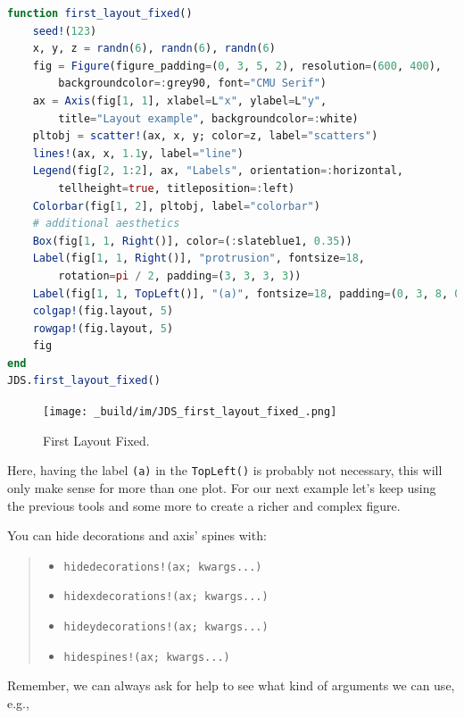 \documentclass[
  notoc %
]{tufte-book}
\providecommand{\tightlist}{%
  \setlength{\itemsep}{0pt}\setlength{\parskip}{0pt}
}
\newcommand{\passthrough}[1]{#1}
\begin{document}
\begin{lstlisting}[language=Julia]
function first_layout_fixed()
    seed!(123)
    x, y, z = randn(6), randn(6), randn(6)
    fig = Figure(figure_padding=(0, 3, 5, 2), resolution=(600, 400),
        backgroundcolor=:grey90, font="CMU Serif")
    ax = Axis(fig[1, 1], xlabel=L"x", ylabel=L"y",
        title="Layout example", backgroundcolor=:white)
    pltobj = scatter!(ax, x, y; color=z, label="scatters")
    lines!(ax, x, 1.1y, label="line")
    Legend(fig[2, 1:2], ax, "Labels", orientation=:horizontal,
        tellheight=true, titleposition=:left)
    Colorbar(fig[1, 2], pltobj, label="colorbar")
    # additional aesthetics
    Box(fig[1, 1, Right()], color=(:slateblue1, 0.35))
    Label(fig[1, 1, Right()], "protrusion", fontsize=18,
        rotation=pi / 2, padding=(3, 3, 3, 3))
    Label(fig[1, 1, TopLeft()], "(a)", fontsize=18, padding=(0, 3, 8, 0))
    colgap!(fig.layout, 5)
    rowgap!(fig.layout, 5)
    fig
end
JDS.first_layout_fixed()
\end{lstlisting}

\begin{figure}
\hypertarget{fig:first_layout_fixed}{%
\centering
\texttt{[image: \_build/im/JDS\_first\_layout\_fixed\_.png]}
\caption{First Layout Fixed.}\label{fig:first_layout_fixed}
}
\end{figure}

Here, having the label \passthrough{\lstinline!(a)!} in the
\passthrough{\lstinline!TopLeft()!} is probably not necessary, this will
only make sense for more than one plot. For our next example let's keep
using the previous tools and some more to create a richer and complex
figure.

You can hide decorations and axis' spines with:

\begin{quote}
\begin{itemize}
\tightlist
\item
  \passthrough{\lstinline"hidedecorations!(ax; kwargs...)"}
\item
  \passthrough{\lstinline"hidexdecorations!(ax; kwargs...)"}
\item
  \passthrough{\lstinline"hideydecorations!(ax; kwargs...)"}
\item
  \passthrough{\lstinline"hidespines!(ax; kwargs...)"}
\end{itemize}
\end{quote}

Remember, we can always ask for help to see what kind of arguments we
can use, e.g.,
\end{document}
